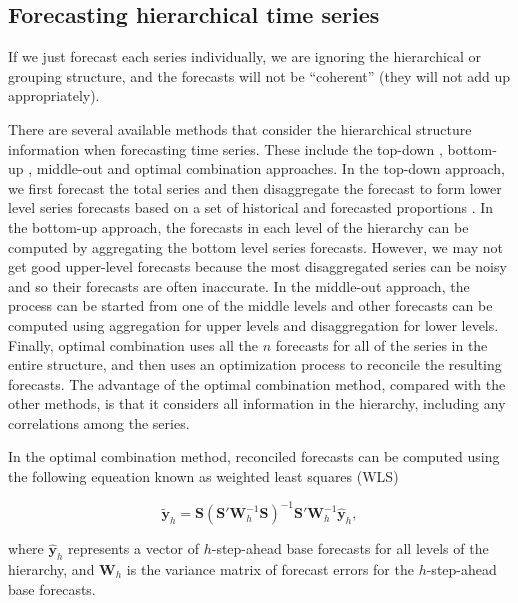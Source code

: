 \documentclass[11pt,a4paper,]{article}
\begin{document}
\hypertarget{forecasting-hierarchical-time-series}{%
\subsection{Forecasting hierarchical time
series}\label{forecasting-hierarchical-time-series}}

If we just forecast each series individually, we are ignoring the
hierarchical or grouping structure, and the forecasts will not be
``coherent'' (they will not add up appropriately).

There are several available methods that consider the hierarchical
structure information when forecasting time series. These include the
top-down \autocite{gross1990disaggregation,fliedner2001hierarchical},
bottom-up \autocite{kahn1998revisiting}, middle-out and optimal
combination \autocite{hyndman2011optimal} approaches. In the top-down
approach, we first forecast the total series and then disaggregate the
forecast to form lower level series forecasts based on a set of
historical and forecasted proportions \autocite[for details
see][]{athanasopoulos2009hierarchical}. In the bottom-up approach, the
forecasts in each level of the hierarchy can be computed by aggregating
the bottom level series forecasts. However, we may not get good
upper-level forecasts because the most disaggregated series can be noisy
and so their forecasts are often inaccurate. In the middle-out approach,
the process can be started from one of the middle levels and other
forecasts can be computed using aggregation for upper levels and
disaggregation for lower levels. Finally, optimal combination uses all
the \(n\) forecasts for all of the series in the entire structure, and
then uses an optimization process to reconcile the resulting forecasts.
The advantage of the optimal combination method, compared with the other
methods, is that it considers all information in the hierarchy,
including any correlations among the series.

In the optimal combination method, reconciled forecasts can be computed
using the following equeation known as weighted least squares (WLS)
\autocite{mint2018}

\begin{equation}\label{eq:mint}
  \tilde{\bm{y}}_{h}=\bm{S}(\bm{S}'\bm{W}_h^{-1}\bm{S})^{-1}\bm{S}'\bm{W}_h^{-1}\hat{\bm{y}}_h,
\end{equation}

where \(\hat{\bm{y}}_h\) represents a vector of \(h\)-step-ahead base
forecasts for all levels of the hierarchy, and \(\bm{W}_h\) is the
variance matrix of forecast errors for the \(h\)-step-ahead base
forecasts.
\end{document}
